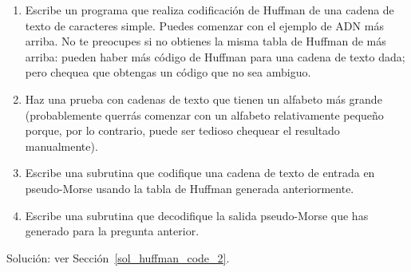 \begin{exercise}
\label{huffman_code_2}
\begin{enumerate}

\item Escribe un programa que realiza codificación de Huffman
de una cadena de texto de caracteres simple. Puedes comenzar con
el ejemplo de ADN más arriba. No te preocupes si no obtienes la
misma tabla de Huffman de más arriba: pueden haber más código
de Huffman para una cadena de texto dada; pero chequea que obtengas
un código que no sea ambiguo.

\item Haz una prueba con cadenas de texto que tienen un alfabeto
más grande (probablemente querrás comenzar con un alfabeto
relativamente pequeño porque, por lo contrario,
puede ser tedioso chequear el resultado manualmente).
 
\item Escribe una subrutina que codifique una cadena de texto
de entrada en pseudo-Morse usando la tabla de Huffman generada
anteriormente.

\item Escribe una subrutina que decodifique la salida pseudo-Morse
que has generado para la pregunta anterior.
\end{enumerate}
%
Solución: ver Sección~\ref{sol_huffman_code_2}.
\end{exercise}

